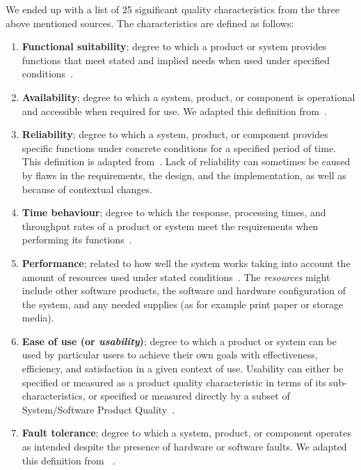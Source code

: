 We ended up with a list of 25 significant quality characteristics from the three above mentioned sources. The characteristics are defined as follows:

\begin{enumerate}
    \item \textbf{Functional suitability}; degree to which a product or system provides functions that meet stated and implied needs when used under specified conditions~\cite{iso_25010_2011_2017}.

    \item \textbf{Availability}; degree to which a system, product, or component is operational and accessible when required for use. We adapted this definition from~\cite{iso_iec_24765_2017}.

    \item \textbf{Reliability}; degree to which a system, product, or component provides specific functions under concrete conditions for a specified period of time. This definition is adapted from~\cite{iso_iec_24765_2017}. Lack of reliability can sometimes be caused by flaws in the requirements, the design, and the implementation, as well as because of contextual changes.  

    \item \textbf{Time behaviour}; degree to which the response, processing times, and throughput rates of a product or system meet the requirements when performing its functions~\cite{iso_25010_2011_2017}.

    \item \textbf{Performance}; related to how well the system works taking into account the amount of resources used under stated conditions~\cite{iso_25010_2011_2017}. The \textit{resources} might include other software products, the software and hardware configuration of the system, and any needed supplies (as for example print paper or storage media).

    \item \textbf{Ease of use (or \textit{usability})}; degree to which a product or system can be used by particular users to achieve their own goals with effectiveness, efficiency, and satisfaction in a given context of use. Usability can either be specified or measured as a product quality characteristic in terms of its sub-characteristics, or specified or measured directly by a subset of System/Software Product Quality~\cite{iso_25010_2011_2017}.

    \item \textbf{Fault tolerance}; degree to which a system, product, or component operates as intended despite the presence of hardware or software faults. We adapted this definition from ~\cite{iso_iec_24765_2017}.


\end{enumerate}
